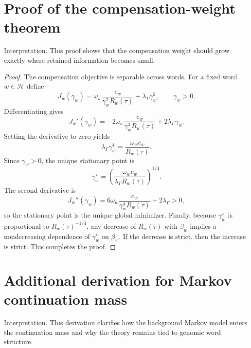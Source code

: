 \documentclass[12pt,letterpaper]{article}
\begin{document}
\section*{Proof of the compensation-weight theorem}\label{app:proofgamma}

Interpretation. This proof shows that the compensation weight should grow exactly where retained information becomes small.

\begin{proof}
The compensation objective is separable across words. For a fixed word $w \in \mathcal{H}$ define
\begin{equation}
J_w(\gamma_w)
=
\omega_w \frac{c_w}{\gamma_w^2 R_w(\tau)}
+
\lambda_{\Gamma}\gamma_w^2,
\qquad \gamma_w>0.
\label{eq:appjw}
\end{equation}
Differentiating gives
\begin{equation}
J_w'(\gamma_w)
=
-2\omega_w \frac{c_w}{\gamma_w^3 R_w(\tau)}
+
2\lambda_{\Gamma}\gamma_w.
\label{eq:appjprime}
\end{equation}
Setting the derivative to zero yields
\begin{equation}
\lambda_{\Gamma}\gamma_w^4
=
\frac{\omega_w c_w}{R_w(\tau)}.
\label{eq:appstationary}
\end{equation}
Since $\gamma_w>0$, the unique stationary point is
\begin{equation}
\gamma_w^{\star}
=
\left(
\frac{\omega_w c_w}{\lambda_{\Gamma}R_w(\tau)}
\right)^{1/4}.
\label{eq:appclosedform}
\end{equation}
The second derivative is
\begin{equation}
J_w''(\gamma_w)
=
6\omega_w \frac{c_w}{\gamma_w^4 R_w(\tau)}
+
2\lambda_{\Gamma}
>
0,
\label{eq:appsecond}
\end{equation}
so the stationary point is the unique global minimizer. Finally, because $\gamma_w^{\star}$ is proportional to $R_w(\tau)^{-1/4}$, any decrease of $R_w(\tau)$ with $\beta_w$ implies a nondecreasing dependence of $\gamma_w^{\star}$ on $\beta_w$. If the decrease is strict, then the increase is strict. This completes the proof.
\end{proof}

\section*{Additional derivation for Markov continuation mass}\label{app:markov}

Interpretation. This derivation clarifies how the background Markov model enters the continuation mass and why the theory remains tied to genomic word structure.
\end{document}
